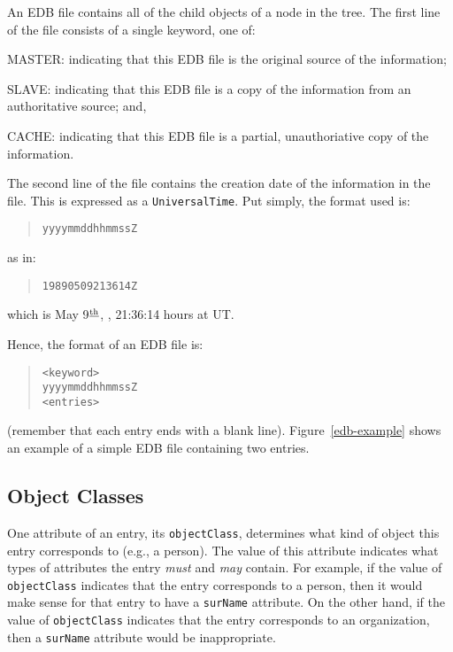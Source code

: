 An EDB file contains all of the child objects of a node in the tree.
The first line of the file consists of a single keyword, one of:
\begin{describe}
\item[MASTER:]	indicating that this EDB file is the original source of the
		information;

\item[SLAVE:]	indicating that this EDB file is a copy of the information
		from an authoritative source;
		and,

\item[CACHE:]	indicating that this EDB file is a partial, unauthoriative
		copy of the information.
\end{describe}
The second line of the file contains the creation date of the information
in the file.
This is expressed as a \verb"UniversalTime".
Put simply,
the format used is:\label{UniversalTime}
\begin{quote}\small\begin{verbatim}
yyyymmddhhmmssZ
\end{verbatim}\end{quote}
as in:
\begin{quote}\small\begin{verbatim}
19890509213614Z
\end{verbatim}\end{quote}
which is May 9$^{\underline{\mbox{\scriptsize th}}}$, {},
21:36:14 hours at UT.

Hence,
the format of an EDB file is:
\begin{quote}\small\begin{verbatim}
<keyword>
yyyymmddhhmmssZ
<entries>
\end{verbatim}\end{quote}
(remember that each entry ends with a blank line).
Figure~\ref{edb-example} shows an example of a simple EDB file
containing two entries.

\subsection	{Object Classes}
One attribute of an entry,
its \verb"objectClass",
determines what kind of object this entry corresponds to (e.g., a person).
The value of this attribute indicates what types of attributes the
entry {\em must\/} and {\em may\/} contain.
For example,
if the value of \verb"objectClass" indicates that the entry corresponds
to a person,
then it would make sense for that entry to have a \verb"surName"
attribute.
On the other hand,
if the value of \verb"objectClass" indicates that the entry corresponds
to an organization,
then a \verb"surName" attribute would be inappropriate.

